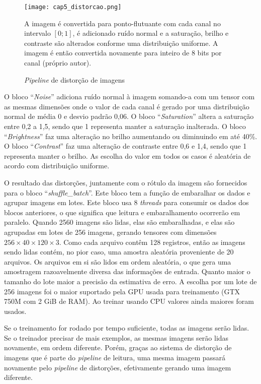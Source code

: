 \begin{figure}[!htb]
	\centering
	\texttt{[image: cap5\_distorcao.png]}
	\caption{\emph{Pipeline} de distorção de imagens}
	\label{fig:cap5_distorcao}
	A imagem é convertida para ponto-flutuante com cada canal no intervalo
	$[0;1]$, é adicionado ruído normal e a saturação, brilho e contraste são
	alterados conforme uma distribuição uniforme. A imagem é então convertida
	novamente para inteiro de 8 bits por canal (próprio autor).
\end{figure}

O bloco ``\emph{Noise}'' adiciona ruído normal à imagem somando-a com um
tensor com as mesmas dimensões onde o valor de cada canal é gerado por
uma distribuição normal de média 0 e desvio padrão 0,06.
O bloco ``\emph{Saturation}'' altera a saturação entre 0,2 a 1,5, sendo que 1
representa manter a saturação inalterada. O bloco ``\emph{Brightness}'' faz
uma alteração no brilho aumentando ou diminuindo em até 40\%. O bloco
``\emph{Contrast}'' faz uma alteração de
contraste entre 0,6 e 1,4, sendo que 1 representa manter o brilho. As escolha
do valor em todos os casos é aleatória de acordo com distribuição uniforme.

O resultado das distorções, juntamente com o rótulo da imagem são fornecidos
para o bloco ``\emph{shuffle\_batch}''. Este bloco tem a função de embaralhar os
dados e agrupar imagens em lotes. Este bloco usa 8 \emph{threads} para consumir
os dados dos blocos anteriores, o que significa que leitura e embaralhamento
ocorrerão em paralelo. Quando 2560 imagens são lidas, elas são embaralhadas, e
elas são agrupadas em lotes de 256 imagens, gerando tensores com
dimensões $256 \times 40 \times 120 \times 3$. Como cada arquivo contêm
128 registros, então as imagens
sendo lidas contém, no pior caso, uma amostra aleatória proveniente de 20
arquivos. Os arquivos em si são lidos em ordem aleatória, o que gera uma
amostragem razoavelmente diversa das informações de entrada.
Quanto maior o tamanho do lote maior a precisão da estimativa de erro.
A escolha por um lote de 256 imagens foi o maior suportado
pela GPU usada para treinamento (GTX 750M com 2 GiB de RAM). Ao treinar
usando CPU valores ainda maiores foram usados.

Se o treinamento for rodado por tempo suficiente, todas as imagens serão
lidas. Se o treinador precisar de mais exemplos, as mesmas imagens serão lidas
novamente, em ordem diferente. Porém, graças ao sistema de distorção de
imagens que é parte do \emph{pipeline} de leitura, uma mesma imagem passará
novamente
pelo \emph{pipeline} de distorções, efetivamente gerando uma imagem diferente.

